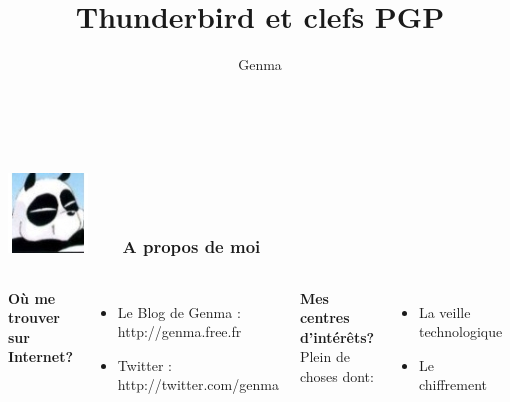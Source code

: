 \documentclass{beamer}
\title[Thunderbird et clefs PGP]{Thunderbird et clefs PGP}
\author{Genma}
\begin{document}
\begin{frame}
	\titlepage
	\vfill
	\begin{center}
		\\[2.5ex]
		{\tiny\CcNote{\CcLongnameByNcSa}}
		\vspace*{-2.5ex}
	\end{center}
\end{frame}





\begin{frame}
\frametitle{\includegraphics[scale=0.4]{./Genma.jpg} \ \ \  A propos de moi  }
\begin{columns}[c] 

\textbf{Où me trouver sur Internet?}
\begin{itemize}
\item Le Blog de Genma : http://genma.free.fr
\item Twitter : http://twitter.com/genma
\end{itemize}

\textbf{Mes centres d'intérêts?}
\\ Plein de choses dont:
\begin{itemize}
\item La veille technologique
\item Le chiffrement
\end{itemize}

\includegraphics[width=5cm,height=5cm]{blog.png} 

\end{columns}
\end{frame}
\end{document}
